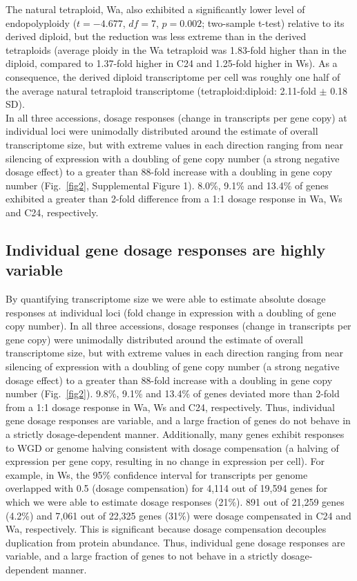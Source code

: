\documentclass[11pt]{article}
\begin{document}
The natural tetraploid, Wa, also exhibited a significantly lower level of endopolyploidy ($t = -4.677$, $df = 7$, $p = 0.002$; two-sample t-test) relative to its derived diploid, but the reduction was less extreme than in the derived tetraploids (average ploidy in the Wa tetraploid was 1.83-fold higher than in the diploid, compared to 1.37-fold higher in C24 and 1.25-fold higher in Ws).
As a consequence, the derived diploid transcriptome per cell was roughly one half of the average natural tetraploid transcriptome (tetraploid:diploid: 2.11-fold $\pm$ 0.18 SD).\\

In all three accessions, dosage responses (change in transcripts per gene copy) at individual loci were unimodally distributed around the estimate of overall transcriptome size, but with extreme values in each direction ranging from near silencing of expression with a doubling of gene copy number (a strong negative dosage effect) to a greater than 88-fold increase with a doubling in gene copy number (Fig.~\ref{fig2}, Supplemental Figure 1).
8.0\%, 9.1\% and 13.4\% of genes exhibited a greater than 2-fold difference from a 1:1 dosage response in Wa, Ws and C24, respectively.\\

\subsection*{Individual gene dosage responses are highly variable}

By quantifying transcriptome size we were able to estimate absolute dosage responses at individual loci (fold change in expression with a doubling of gene copy number). In all three accessions, dosage responses (change in transcripts per gene copy) were unimodally distributed around the estimate of overall transcriptome size, but with extreme values in each direction ranging from near silencing of expression with a doubling of gene copy number (a strong negative dosage effect) to a greater than 88-fold increase with a doubling in gene copy number (Fig.~\ref{fig2}). 9.8\%, 9.1\% and 13.4\% of genes deviated more than 2-fold from a 1:1 dosage response in Wa, Ws and C24, respectively. Thus, individual gene dosage responses are variable, and a large fraction of genes do not behave in a strictly dosage-dependent manner.  
Additionally, many genes exhibit responses to WGD or genome halving consistent with dosage compensation (a halving of expression per gene copy, resulting in no change in expression per cell). For example, in Ws, the 95\% confidence interval for transcripts per genome overlapped with 0.5 (dosage compensation) for 4,114 out of 19,594 genes for which we were able to estimate dosage responses (21\%). 891 out of 21,259 genes (4.2\%) and 7,061 out of 22,325 genes (31\%) were dosage compensated in C24 and Wa, respectively. This is significant because dosage compensation decouples duplication from protein abundance. Thus, individual gene dosage responses are variable, and a large fraction of genes to not behave in a strictly dosage-dependent manner.
	
\end{document}
